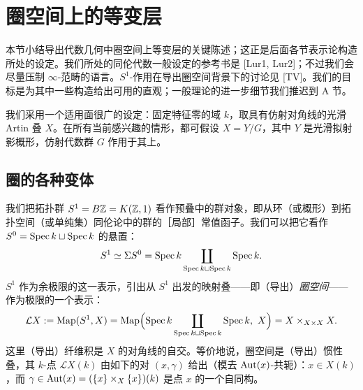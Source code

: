 \section{圈空间上的等变层}

本节小结导出代数几何中圈空间上等变层的关键陈述；这正是后面各节表示论构造所处的设定。我们所处的同伦代数一般设定的参考书是 [Lur1, Lur2]；不过我们会尽量压制 $\infty$-范畴的语言。$S^1$-作用在导出圈空间背景下的讨论见 [TV]。我们的目标是为其中一些构造给出可用的直观；一般理论的进一步细节我们推迟到 A 节。

我们采用一个适用面很广的设定：固定特征零的域 $k$，取具有仿射对角线的光滑 Artin 叠 $X$。在所有当前感兴趣的情形，都可假设 $X=Y/G$，其中 $Y$ 是光滑拟射影概形，仿射代数群 $G$ 作用于其上。

\subsection{圈的各种变体}

我们把拓扑群 $S^1=B\mathbb{Z}=K(\mathbb{Z},1)$ 看作预叠中的群对象，即从环（或概形）到拓扑空间（或单纯集）同伦论中的群的［局部］常值函子。我们可以把它看作 $S^0=\operatorname{Spec} k\sqcup\operatorname{Spec} k$ 的悬置：
\[
S^1\simeq\Sigma S^0=\operatorname{Spec} k\coprod_{\operatorname{Spec} k\sqcup\operatorname{Spec} k}\operatorname{Spec} k.
\]
$S^1$ 作为余极限的这一表示，引出从 $S^1$ 出发的映射叠——即（导出）\emph{圈空间}——作为极限的一个表示：
\[
\mathcal L X:=\operatorname{Map}(S^1,X)=\operatorname{Map}\Bigl(\operatorname{Spec} k\coprod_{\operatorname{Spec} k\sqcup\operatorname{Spec} k}\operatorname{Spec} k,\ X\Bigr)=X\times_{X\times X}X.
\]
这里（导出）纤维积是 $X$ 的对角线的自交。等价地说，圈空间是（导出）惯性叠，其 $k$-点 $\mathcal L X(k)$ 由如下的对 $(x,\gamma)$ 给出（模去 $\operatorname{Aut}(x)$-共轭）：$x\in X(k)$，而 $\gamma\in\operatorname{Aut}(x)=(\{x\}\times_X\{x\})(k)$ 是点 $x$ 的一个自同构。

